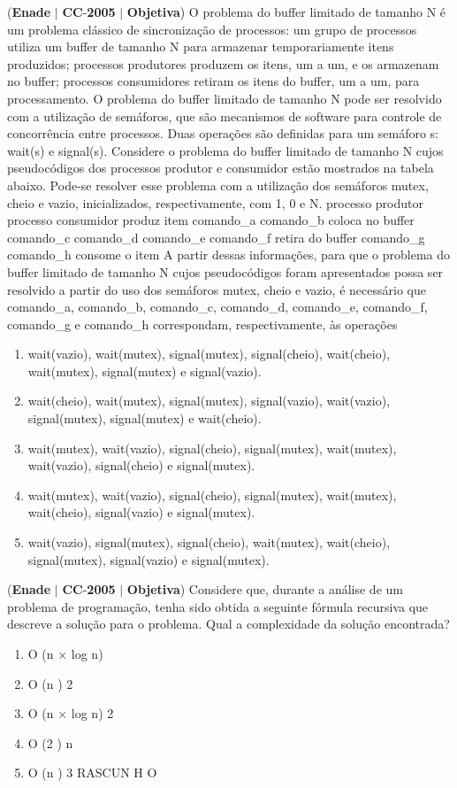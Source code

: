 \documentclass{exam}
\begin{document}
\begin{questions}
\question (\textbf{Enade} $|$ \textbf{CC}-\textbf{2005} $|$ \textbf{Objetiva})
O problema do buffer limitado de tamanho N é um
problema clássico de sincronização de processos: um grupo de
processos utiliza um buffer de tamanho N para armazenar
temporariamente itens produzidos; processos produtores
produzem os itens, um a um, e os armazenam no buffer;
processos consumidores retiram os itens do buffer, um a um,
para processamento. O problema do buffer limitado de tamanho
N pode ser resolvido com a utilização de semáforos, que são
mecanismos de software para controle de concorrência entre
processos. Duas operações são definidas para um semáforo
s: wait(s) e signal(s).
Considere o problema do buffer limitado de tamanho N
cujos pseudocódigos dos processos produtor e consumidor
estão mostrados na tabela abaixo. Pode-se resolver esse
problema com a utilização dos semáforos mutex, cheio e vazio,
inicializados, respectivamente, com 1, 0 e N.
processo produtor processo consumidor
produz item
comando\_a
comando\_b
coloca no buffer
comando\_c
comando\_d
comando\_e
comando\_f
retira do buffer
comando\_g
comando\_h
consome o item
A partir dessas informações, para que o problema do buffer
limitado de tamanho N cujos pseudocódigos foram
apresentados possa ser resolvido a partir do uso dos semáforos
mutex, cheio e vazio, é necessário que comando\_a,
comando\_b, comando\_c, comando\_d, comando\_e,
comando\_f, comando\_g e comando\_h correspondam,
respectivamente, às operações
	\begin{enumerate}[label=\alph*)]
		\item  wait(vazio), wait(mutex), signal(mutex),
signal(cheio), wait(cheio), wait(mutex),
signal(mutex) e signal(vazio).
		\item  wait(cheio), wait(mutex), signal(mutex),
signal(vazio), wait(vazio), signal(mutex),
signal(mutex) e wait(cheio).
		\item  wait(mutex), wait(vazio), signal(cheio),
signal(mutex), wait(mutex), wait(vazio),
signal(cheio) e signal(mutex).
		\item  wait(mutex), wait(vazio), signal(cheio),
signal(mutex), wait(mutex), wait(cheio),
signal(vazio) e signal(mutex).
		\item  wait(vazio), signal(mutex), signal(cheio),
wait(mutex), wait(cheio), signal(mutex),
signal(vazio) e signal(mutex).
	\end{enumerate}

\question (\textbf{Enade} $|$ \textbf{CC}-\textbf{2005} $|$ \textbf{Objetiva})
Considere que, durante a análise de um problema de programação,
tenha sido obtida a seguinte fórmula recursiva que descreve a
solução para o problema.
Qual a complexidade da solução encontrada?
	\begin{enumerate}[label=\alph*)]
		\item  O (n × log n)
		\item  O (n )
2
		\item  O (n × log n)
2
		\item  O (2 )
n
		\item  O (n )
3
RASCUN H O
	\end{enumerate}


\end{questions}
\end{document}
